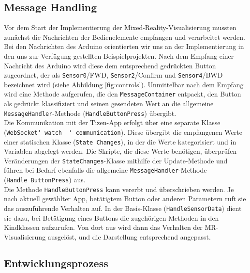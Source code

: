 \documentclass[11pt, a4paper]{article}
\begin{document}
\subsection{Message Handling}

Vor dem Start der Implementierung der Mixed-Reality-Visualisierung mussten zunächst die Nachrichten der Bedienelemente empfangen und verarbeitet werden. Bei den Nachrichten des Arduino orientierten wir uns an der Implementierung in den uns zur Verfügung gestellten Beispielprojekten. Nach dem Empfang einer Nachricht des Arduino wird diese dem entsprechend gedrückten Button zugeordnet, der als \texttt{Sensor0}/FWD, \texttt{Sensor2}/Confirm und \texttt{Sensor4}/BWD bezeichnet wird (siehe Abbildung \ref{fig:controls}). Unmittelbar nach dem Empfang wird eine Methode aufgerufen, die den \texttt{MessageContainer} entpackt, den Button als gedrückt klassifiziert und seinen gesendeten Wert an die allgemeine \texttt{MessageHandler}-Methode (\texttt{HandleButtonPress}) übergibt.\\
Die Kommunikation mit der Tizen-App erfolgt über eine separate Klasse (\texttt{WebSocket\char`_watch \ \char`_communication}). Diese übergibt die empfangenen Werte einer statischen Klasse (\texttt{State\ Changes}), in der die Werte kategorisiert und in Variablen abgelegt werden. Die Skripte, die diese Werte benötigen, überprüfen Veränderungen der \texttt{StateChanges}-Klasse mithilfe der Update-Methode und führen bei Bedarf ebenfalls die allgemeine \texttt{MessageHandler}-Methode (\texttt{Handle\ ButtonPress}) aus.\\
Die Methode \texttt{HandleButtonPress} kann vererbt und überschrieben werden. Je nach aktuell gewählter App, betätigtem Button oder anderen Parametern ruft sie das auszuführende Verhalten auf. In der Basis-Klasse (\texttt{HandleSensorData}) dient sie dazu, bei Betätigung eines Buttons die zugehörigen Methoden in den Kindklassen aufzurufen. Von dort aus wird dann das Verhalten der MR-Visualisierung ausgelöst, und die Darstellung entsprechend angepasst.

\subsection{Entwicklungsprozess}
\end{document}
